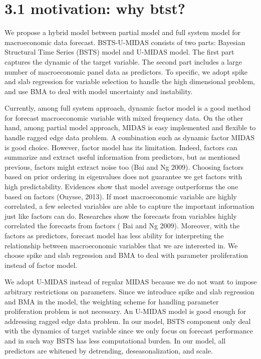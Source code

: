 \label{chapter:newsol}





\section{3.1 motivation:  why btst?}   

We propose a hybrid model between partial model and full system model for macroeconomic data forecast. BSTS-U-MIDAS consists of two parts: Bayesian Structural Time Series (BSTS) model and U-MIDAS model. The first part captures the dynamic of the target variable. The second part includes a large number of macroeconomic panel data as predictors. To specific, we adopt spike and slab regression for variable selection to handle the high dimensional problem, and use BMA to deal with model uncertainty and instability. 

Currently, among full system approach, dynamic factor model is a good method for forecast macroeconomic variable with mixed frequency data. On the other hand, among partial model approach, MIDAS is easy implemented and flexible to handle ragged edge data problem. A combination such as dynamic factor MIDAS is good choice. However, factor model has its limitation. Indeed, factors can summarize and extract useful information from predictors, but as mentioned previous, factors might extract noise too \cite{Bai2009} (Bai and Ng 2009). Choosing factors based on prior ordering in eigenvalues does not guarantee we get factors with high predictability. Evidences show that model average outperforms the one based on factors \cite{Ouysse2013} (Ouysse, 2013). If most macroeconomic variable are highly correlated, a few selected variables are able to capture the important information just like factors can do. Researches show the forecasts from variables highly correlated the forecasts from factors \cite{Bai2009}( Bai and Ng 2009). Moreover, with the factors as predictors, forecast model has less ability for interpreting the relationship between macroeconomic variables that we are interested in. We choose spike and slab regression and BMA to deal with parameter proliferation instead of factor model.  


We adopt U-MIDAS instead of regular MIDAS because we do not want to impose arbitrary restrictions on parameters. Since we introduce spike and slab regression and BMA in the model, the weighting scheme for handling parameter proliferation problem is not necessary. An U-MIDAS model is good enough for addressing ragged edge data problem. In our model, BSTS component only deal with the dynamics of target variable since we only focus on forecast performance and in such way BSTS has less computational burden. In our model, all predictors are whitened by detrending, deseasonalization, and scale. 


